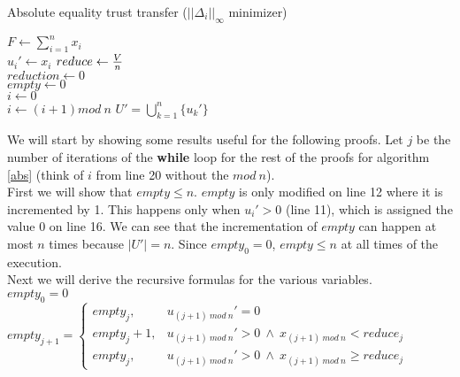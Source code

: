 \documentclass[11pt]{article}
\theoremstyle{definition}
\theoremstyle{corollary}
\theoremstyle{lemma}
\begin{document}
    \begin{algorithm}[H]
       \label{abs}
       \caption{Absolute equality trust transfer ($||\Delta_i||_\infty$ minimizer)}
       $F \gets \sum\limits_{i=1}^{n}x_i$ \\
          {$u_i' \gets x_i$}
       $reduce \gets {V \over n}$ \\
       $reduction \gets 0$ \\
       $empty \gets 0$ \\
       $i \gets 0$ \\
          {
           $i \gets (i + 1) mod \:n$}
       \Return $U' = \bigcup\limits_{k=1}^{n}\{u_k'\}$
    \end{algorithm}
       \noindent
       We will start by showing some results useful for the following proofs. Let $j$ be the number of iterations of the
       \textbf{while} loop for the rest of the proofs for algorithm \ref{abs} (think of $i$ from line 20 without the
       $mod\:n$).\\
       First we will show that $empty \leq n$. $empty$ is only modified on line 12 where it is incremented by 1. This
       happens only when $u_i' > 0$ (line 11), which is assigned the value 0 on line 16. We can see that the
       incrementation of $empty$ can happen at most $n$ times because $|U'| = n$. Since $empty_0 = 0$, $empty \leq n$
       at all times of the execution. \\
       Next we will derive the recursive formulas for the various variables. \\
       $empty_0 = 0$ \\
       $empty_{j+1} = 
          \begin{cases}
             empty_j, & u_{(j+1)\:mod\:n}' = 0 \\
             empty_j+1, & u_{(j+1)\:mod\:n}' > 0 \: \wedge \: x_{(j+1) \:mod\:n} < reduce_j \\
             empty_j, & u_{(j+1)\:mod\:n}' > 0 \: \wedge \: x_{(j+1) \:mod\:n} \geq reduce_j
          \end{cases}$ \\ \ \\
\end{document}
